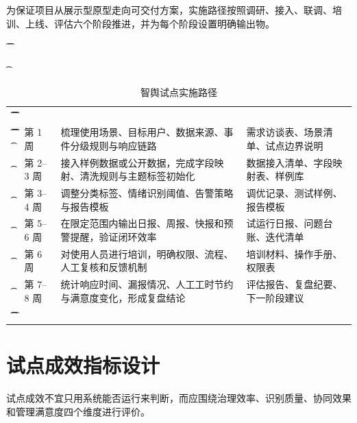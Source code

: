 为保证项目从展示型原型走向可交付方案，实施路径按照调研、接入、联调、培训、上线、评估六个阶段推进，并为每个阶段设置明确输出物。

\begin{table}[htbp]
	\t\centering
	\t\caption{智舆试点实施路径}
	\t\begin{tabularx}{\textwidth}{|L{2cm}L{2.1cm}YL{3cm}|}
		\t\t\toprule
		\t\t{} &  &                   &    \\
		\t\t\midrule
		\t\t{}
		\t{}         & 第 1 周        & 梳理使用场景、目标用户、数据来源、事件分级规则与响应链路    & 需求访谈表、场景清单、试点边界说明 \\
		\t{}         & 第 2--3 周     & 接入样例数据或公开数据，完成字段映射、清洗规则与主题标签初始化 & 数据接入清单、字段映射表、样例库  \\
		\t{}         & 第 3--4 周     & 调整分类标签、情绪识别阈值、告警策略与报告模板         & 调优记录、测试样例、报告模板    \\
		\t{}        & 第 5--6 周     & 在限定范围内输出日报、周报、快报和预警提醒，验证闭环效率    & 试运行日报、问题台账、迭代清单   \\
		\t{}         & 第 6 周        & 对使用人员进行培训，明确权限、流程、人工复核和反馈机制     & 培训材料、操作手册、权限表     \\
		\t{}         & 第 7--8 周     & 统计响应时间、漏报情况、人工工时节约与满意度变化，形成复盘结论 & 评估报告、复盘纪要、下一阶段建议  \\
		\t\t\bottomrule
		\t\end{tabularx}
\end{table}

\section{试点成效指标设计}

试点成效不宜只用系统能否运行来判断，而应围绕治理效率、识别质量、协同效果和管理满意度四个维度进行评价。

